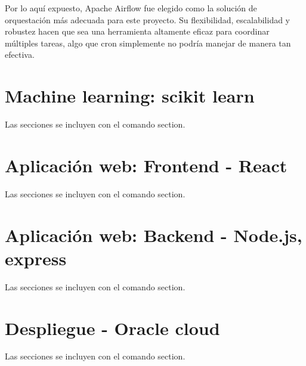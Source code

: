Por lo aquí expuesto, Apache Airflow fue elegido como la solución de orquestación más adecuada para este proyecto. Su flexibilidad, escalabilidad y robustez hacen que sea una herramienta altamente eficaz para coordinar múltiples tareas, algo que cron simplemente no podría manejar de manera tan efectiva.


\section{Machine learning: scikit learn}

Las secciones se incluyen con el comando section.

\section{Aplicación web: Frontend - React}

Las secciones se incluyen con el comando section.

\section{Aplicación web: Backend - Node.js, express}

Las secciones se incluyen con el comando section.

\section{Despliegue - Oracle cloud}

Las secciones se incluyen con el comando section.
